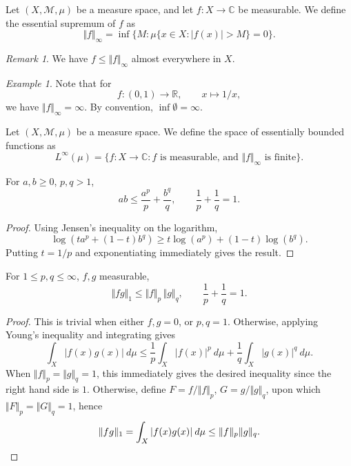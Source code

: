 \documentclass[11pt]{article}
\newcommand{\C}{\mathbb{C}}
\newcommand{\R}{\mathbb{R}}
\newcommand{\M}{\mathcal{M}}
\newcommand{\norm}[1]{\Vert #1 \Vert}
\theoremstyle{definition}
\theoremstyle{remark}
\newtheorem*{remark}{Remark}
\newtheorem*{example}{Example}
\numberwithin{equation}{section}
\begin{document}
    \begin{definition}
        Let $(X, \M, \mu)$ be a measure space, and let $f\colon X \to \C$ be
        measurable. We define the essential supremum of $f$ as \[
            \norm{f}_\infty = \inf \{M : \mu\{x \in X: |f(x)| > M\} = 0\}.
        \]
        \begin{remark}
            We have $f \leq \norm{f}_\infty$ almost everywhere in $X$.
        \end{remark}
    \end{definition}
    \begin{example}
        Note that for \[
            f\colon (0, 1) \to \R, \qquad x \mapsto 1 / x,
        \] we have $\norm{f}_\infty = \infty$. By convention, $\inf\emptyset =
        \infty$.
    \end{example}

    \begin{definition}
        Let $(X, \M, \mu)$ be a measure space. We define the space of essentially
        bounded functions as \[
            L^\infty(\mu) = \{f\colon X \to \C : f\text{ is measurable, and }
            \norm{f}_\infty \text{ is finite}\}.
        \]
    \end{definition}

    \begin{lemma}[Young]
        For $a, b \geq 0$, $p, q > 1$, \[
            ab \leq \frac{a^p}{p} + \frac{b^q}{q}, \qquad \frac{1}{p} + \frac{1}{q} =
            1.
        \] 
    \end{lemma}
    \begin{proof}
        Using Jensen's inequality on the logarithm, \[
            \log(ta^p + (1 - t)b^q) \geq t\log(a^p) + (1 - t)\log(b^q).
        \] Putting $t = 1 / p$ and exponentiating immediately gives the result.
    \end{proof}

    \begin{lemma}[H\"older]
        For $1 \leq p, q \leq \infty$, $f, g$ measurable, \[
            \norm{fg}_1 \leq \norm{f}_p\, \norm{g}_q, \qquad \frac{1}{p}
            + \frac{1}{q} = 1.
        \] 
    \end{lemma}
    \begin{proof}
        This is trivial when either $f, g = 0$, or $p, q = 1$.  Otherwise, applying
        Young's inequality and integrating gives
        \[
            \int_X |f(x)g(x)|\:d\mu \leq \frac{1}{p}\int_X |f(x)|^p\:d\mu +
            \frac{1}{q}\int_X |g(x)|^q\:d\mu.
        \] When $\norm{f}_p = \norm{g}_q = 1$, this immediately gives the desired
        inequality since the right hand side is $1$. Otherwise, define $F = f /
        \norm{f}_p$, $G = g / \norm{g}_q$, upon which $\norm{F}_p = \norm{G}_q = 1$,
        hence \[
            \norm{fg}_1 = \int_X |f(x)g(x)|\:d\mu \leq \norm{f}_p\norm{g}_q. \qedhere
        \] 
    \end{proof}
\end{document}
